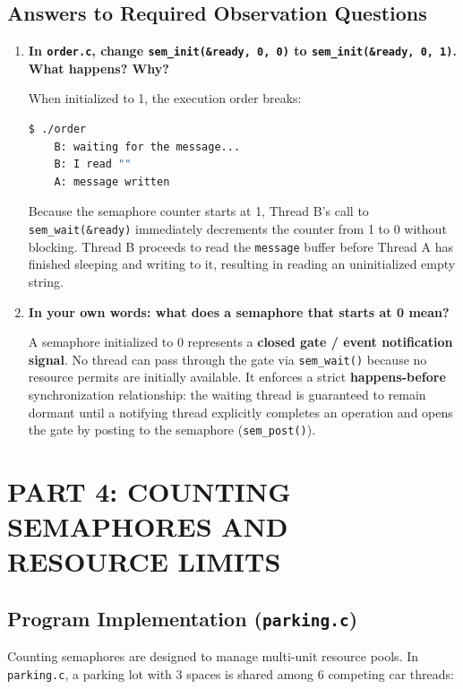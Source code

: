 \documentclass[12pt,a4paper]{report}
\numberwithin{equation}{chapter}
\numberwithin{figure}{chapter}
\numberwithin{table}{chapter}
\begin{document}
\section{Answers to Required Observation Questions}
\begin{enumerate}
    \item \textbf{In \texttt{order.c}, change \texttt{sem\_init(\&ready, 0, 0)} to \texttt{sem\_init(\&ready, 0, 1)}. What happens? Why?}
    
    When initialized to 1, the execution order breaks:
    \begin{lstlisting}[language=bash]
    $ ./order
    B: waiting for the message...
    B: I read ""
    A: message written
    \end{lstlisting}
    Because the semaphore counter starts at 1, Thread B's call to \texttt{sem\_wait(\&ready)} immediately decrements the counter from 1 to 0 without blocking. Thread B proceeds to read the \texttt{message} buffer before Thread A has finished sleeping and writing to it, resulting in reading an uninitialized empty string.

    \item \textbf{In your own words: what does a semaphore that starts at 0 mean?}
    
    A semaphore initialized to 0 represents a \textbf{closed gate / event notification signal}. No thread can pass through the gate via \texttt{sem\_wait()} because no resource permits are initially available. It enforces a strict \textbf{happens-before} synchronization relationship: the waiting thread is guaranteed to remain dormant until a notifying thread explicitly completes an operation and opens the gate by posting to the semaphore (\texttt{sem\_post()}).
\end{enumerate}

\chapter{PART 4: COUNTING SEMAPHORES AND RESOURCE LIMITS}

\section{Program Implementation (\texttt{parking.c})}
Counting semaphores are designed to manage multi-unit resource pools. In \texttt{parking.c}, a parking lot with 3 spaces is shared among 6 competing car threads:
\end{document}
